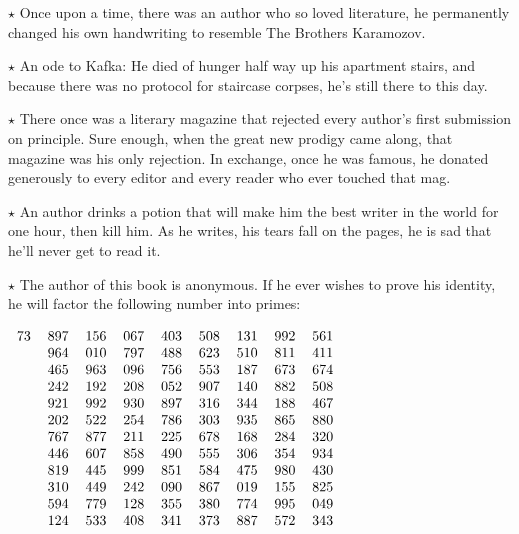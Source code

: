 \documentclass[oneside]{book}
\begin{document}
$\star$ Once upon a time, there was an author who so loved literature,
he permanently changed his own handwriting to resemble The Brothers Karamozov.


$\star$ An ode to Kafka: He died of hunger half way up his apartment stairs,
and because there was no protocol for staircase corpses, he's still there
to this day.

$\star$ There once was a literary magazine that rejected every author's first
submission on principle.  Sure enough, when the great new prodigy came along,
that magazine was his only rejection.  In exchange, once he was famous, he
donated generously to every editor and every reader who ever touched that mag.


$\star$ An author drinks a potion that will make him the best writer in the world
for one hour, then kill him.  As he writes, his tears fall on the pages, he is sad
that he'll never get to read it.


$\star$ The author of this book is anonymous.  If he ever wishes to prove his identity,
he will factor the following number into primes:

{
\centering
$
\begin{tabular}{rllllllll}
73 &897 &156 &067 &403 &508 &131 &992 &561 \\
{} &964 &010 &797 &488 &623 &510 &811 &411\\
{} &465 &963 &096 &756 &553 &187 &673 &674\\
{} &242 &192 &208 &052 &907 &140 &882 &508\\
{} &921 &992 &930 &897 &316 &344 &188 &467\\
{} &202 &522 &254 &786 &303 &935 &865 &880\\
{} &767 &877 &211 &225 &678 &168 &284 &320\\
{} &446 &607 &858 &490 &555 &306 &354 &934\\
{} &819 &445 &999 &851 &584 &475 &980 &430\\
{} &310 &449 &242 &090 &867 &019 &155 &825\\
{} &594 &779 &128 &355 &380 &774 &995 &049\\
{} &124 &533 &408 &341 &373 &887 &572 &343
\end{tabular}
$
\par
}
\end{document}
